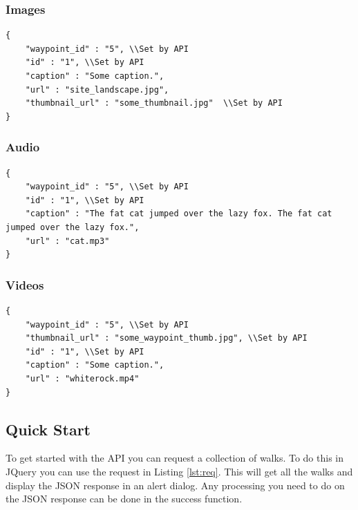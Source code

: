 \documentclass[11pt,a4paper]{report}
\begin{document}
\subsubsection{Images}

\begin{lstlisting}[captionpos=b, caption=An example JSON Waypoint Object., label=lst:walk]
{
    "waypoint_id" : "5", \\Set by API
    "id" : "1", \\Set by API
    "caption" : "Some caption.",
    "url" : "site_landscape.jpg",
    "thumbnail_url" : "some_thumbnail.jpg"  \\Set by API
}
\end{lstlisting}

\subsubsection{Audio}

\begin{lstlisting}[captionpos=b, caption=An example JSON Waypoint Object., label=lst:walk]
{
    "waypoint_id" : "5", \\Set by API
    "id" : "1", \\Set by API
    "caption" : "The fat cat jumped over the lazy fox. The fat cat jumped over the lazy fox.",
    "url" : "cat.mp3"
}
\end{lstlisting}

\subsubsection{Videos}

\begin{lstlisting}[captionpos=b, caption=An example JSON Waypoint Object., label=lst:walk]
{
    "waypoint_id" : "5", \\Set by API
    "thumbnail_url" : "some_waypoint_thumb.jpg", \\Set by API
    "id" : "1", \\Set by API
    "caption" : "Some caption.",
    "url" : "whiterock.mp4"
}
\end{lstlisting}

\subsection{Quick Start}

To get started with the API you can request a collection of walks. To do this in JQuery you can use the request in Listing \ref{lst:req}. This will get all the walks and display the JSON response in an alert dialog. Any processing you need to do on the JSON response can be done in the success function.
\end{document}
